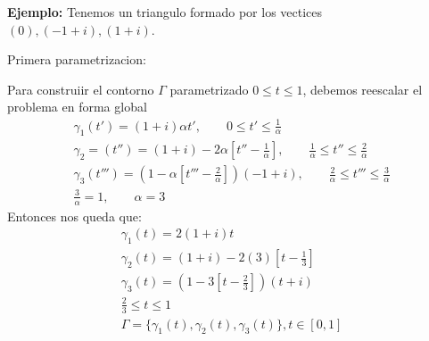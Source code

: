 \documentclass{article}
\begin{document}
\hfill 

\hfill

\textbf{Ejemplo: }Tenemos un triangulo formado por los vectices $ (0), (-1+i ), (1+i ) $. 

Primera parametrizacion: 

Para construiir el contorno $ \Gamma  $ parametrizado $ 0\leq t\leq 1  $, debemos reescalar el problema en forma global
\begin{gather*}
  \gamma_1(t') = (1+i) \alpha t', \qquad 0 \leq t'\leq \frac{1}{\alpha}\\
  \gamma_2 = (t'') = (1 + i ) - 2 \alpha[t'' - \frac{1}{\alpha}],\qquad \frac{1}{\alpha} \leq t'' \leq \frac{2 }{\alpha}\\
  \gamma_3(t''') = \left(1 - \alpha \left[t''' - \frac{2 }{\alpha}\right]\right)(-1+i), \qquad \frac{2 }{\alpha} \leq t''' \leq \frac{3 }{\alpha}\\
  \frac{3}{\alpha} = 1 , \qquad \alpha = 3 
\end{gather*}
Entonces nos queda que: 
\begin{gather*}
  \gamma_1(t) = 2 (1 + i )t \\
  \gamma_2(t) = (1+i ) - 2 (3) \left[t - \frac{1}{3}\right]\\
  \gamma_3(t) = \left(1 - 3 \left[t - \frac{2 }{3 }\right]\right)(t + i ) \\
  \frac{2 }{3 } \leq t \leq 1 \\
  \Gamma = \{\gamma_1(t), \gamma_2(t), \gamma_3(t) \}, t\in [0,1]
\end{gather*}
\end{document}
